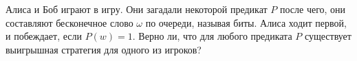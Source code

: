 Алиса и Боб играют в игру. Они загадали некоторой предикат $P$ после чего, они составляют бесконечное
слово $\omega$ по очереди, называя биты. Алиса ходит первой, и побеждает, если $P(w) = 1$. Верно ли, что
для любого предиката $P$ существует выигрышная стратегия для одного из игроков?